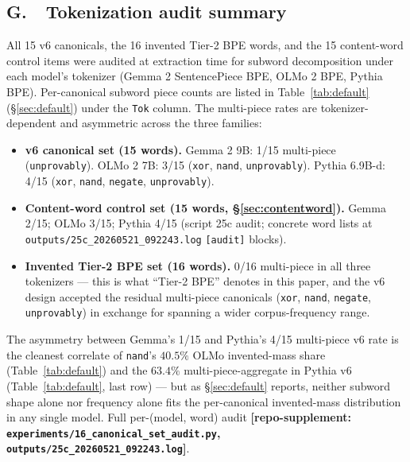 \documentclass[11pt,letterpaper]{article}
\begin{document}
\subsection*{G.\ \ Tokenization audit summary}
All 15 v6 canonicals, the
16 invented Tier-2 BPE words, and the 15 content-word control items
were audited at extraction time for subword decomposition under each
model's tokenizer (Gemma 2 SentencePiece BPE, OLMo 2 BPE, Pythia
BPE). Per-canonical subword piece counts are listed in
Table~\ref{tab:default} (\S\ref{sec:default}) under the
\texttt{Tok} column. The multi-piece rates are tokenizer-dependent
and asymmetric across the three families:

\begin{itemize}
  \item \textbf{v6 canonical set (15 words).} Gemma 2 9B: 1/15
    multi-piece (\texttt{unprovably}). OLMo 2 7B: 3/15
    (\texttt{xor}, \texttt{nand}, \texttt{unprovably}). Pythia 6.9B-d:
    4/15 (\texttt{xor}, \texttt{nand}, \texttt{negate},
    \texttt{unprovably}).
  \item \textbf{Content-word control set (15 words,
    \S\ref{sec:contentword}).} Gemma 2/15; OLMo 3/15; Pythia 4/15
    (script 25c audit; concrete word lists at
    \texttt{outputs/25c\_20260521\_092243.log} \texttt{[audit]}
    blocks).
  \item \textbf{Invented Tier-2 BPE set (16 words).} 0/16
    multi-piece in all three tokenizers --- this is what ``Tier-2
    BPE'' denotes in this paper, and the v6 design accepted the
    residual multi-piece canonicals (\texttt{xor}, \texttt{nand},
    \texttt{negate}, \texttt{unprovably}) in exchange for spanning a
    wider corpus-frequency range.
\end{itemize}

The asymmetry between Gemma's 1/15 and Pythia's 4/15 multi-piece v6
rate is the cleanest correlate of \texttt{nand}'s $40.5\%$ OLMo
invented-mass share (Table~\ref{tab:default}) and the $63.4\%$
multi-piece-aggregate in Pythia v6 (Table~\ref{tab:default}, last
row) --- but as \S\ref{sec:default} reports, neither subword shape
alone nor frequency alone fits the per-canonical invented-mass
distribution in any single model. Full per-(model, word) audit
\textbf{[repo-supplement:
\texttt{experiments/16\_canonical\_set\_audit.py},
\texttt{outputs/25c\_20260521\_092243.log}]}.
\end{document}
